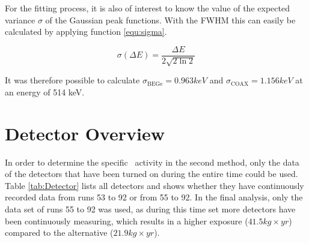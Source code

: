 For the fitting process, it is also of interest to know the value of the expected variance $\sigma$ of the Gaussian peak functions.
With the FWHM this can easily be calculated by applying function \ref{equ:sigma}.

\begin{equation}
\sigma (\Delta E) = \frac{\Delta E}{2\sqrt{2\ln2}}
\label{equ:sigma}
\end{equation}

It was therefore possible to calculate $\sigma_{\mathrm{BEGe}} = 0.963 \unit{keV}$ and $\sigma_{\mathrm{COAX}} = 1.156 \unit{keV}$ at an energy of 514 keV.


\chapter{Detector Overview}

In order to determine the specific \Kr\ activity in the second method, only the data of the detectors that have been turned on during the entire time could be used.
Table \ref{tab:Detector} lists all detectors and shows whether they have continuously recorded data from runs 53 to 92 or from 55 to 92.
In the final analysis, only the data set of runs 55 to 92 was used, as during this time set more detectors have been continuously measuring, which results in a higher exposure ($41.5 \unit{kg}\times\unit{yr}$) compared to the alternative ($21.9 \unit{kg}\times\unit{yr}$).

